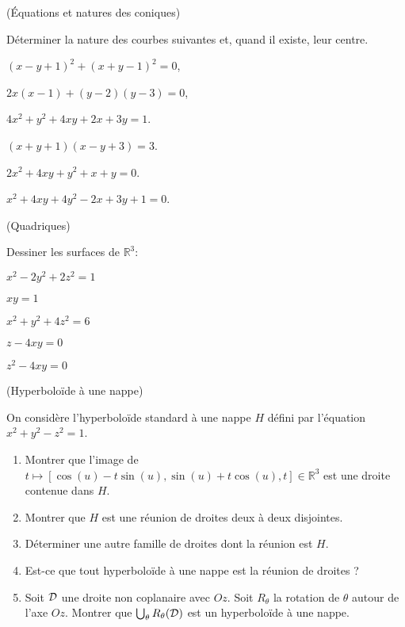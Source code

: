 \documentclass[a4paper,12pt,reqno]{amsart}
\begin{document}
\begin{exo} (Équations et natures des coniques)

  Déterminer la nature des courbes suivantes et, quand il existe, leur centre.
  \begin{examplescol}{2}
    \item $(x-y+1)^2+(x+y-1)^2=0$,
    \item $2x(x-1)+(y-2)(y-3)=0$,
    \item $4x^{2}+y^{2}+4xy+2x+3y=1$.
    \item $(x+y+1)(x-y+3)=3$.
    \item $2x^{2}+4xy+y^{2}+x+y=0$.
    \item $x^{2}+4xy+4y^{2}-2x+3y+1=0$.
  \end{examplescol}

\end{exo}


\begin{exo} (Quadriques)

  Dessiner les surfaces de $\mathbb{R}^{3}$:
  \begin{examplescol}{2}
    \item $x^2-2y^2+2z^2=1$
    \item $xy=1$
    \item $x^2+y^2+4z^2=6$
    \item $z-4xy=0$
    \item $z^2-4xy=0$
  \end{examplescol}

\end{exo}


\begin{exo} (Hyperboloïde à une nappe)

  On considère l'hyperboloïde standard à une nappe $H$ défini par l'équation $x^{2}+y^{2}-z^{2}=1$.
  \begin{enumerate}
    \item Montrer que l'image de $t\mapsto[\cos(u)-t\sin(u),\sin(u)+t\cos(u),t]\in \mathbb{R}^{3}$ est une droite contenue dans $H$.
    \item Montrer que $H$ est une réunion de droites deux à deux disjointes.
    \item Déterminer une autre famille de droites dont la réunion est $H$.
    \item Est-ce que tout hyperboloïde à une nappe est la réunion de droites ?
    \item Soit $\mathcal{D}$ une droite non coplanaire avec $Oz$. Soit $R_{\theta}$ la rotation de $\theta$ autour de l'axe $Oz$. Montrer que $\bigcup_{\theta}R_{\theta}(\mathcal{D})$ est un hyperboloïde à une nappe.
  \end{enumerate}

\end{exo}
\end{document}
